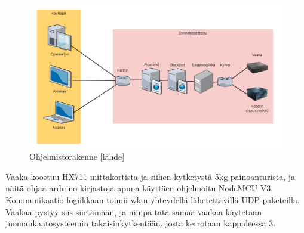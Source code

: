 \newpage

\begin{figure}[h]
\begin{center}
\includegraphics{img/rakenne_lowres.png}
\end{center}
\caption{Ohjelmistorakenne [lähde]}
\label{fig:rakenne}
\end{figure}

Vaaka koostuu HX711-mittakortista ja siihen kytketystä 5kg painoanturista, ja näitä ohjaa arduino-kirjastoja apuna käyttäen ohjelmoitu NodeMCU V3. Kommunikaatio logiikkaan toimii wlan-yhteydellä lähetettävillä UDP-paketeilla. Vaakaa pystyy siis siirtämään, ja niinpä tätä samaa vaakaa käytetään juomankaatosysteemin takaisinkytkentään, josta kerrotaan kappaleessa 3.
